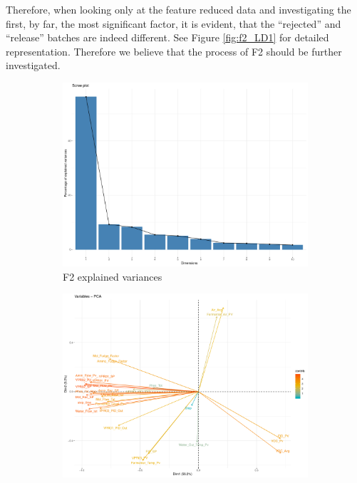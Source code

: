 Therefore, when looking only at the feature reduced data and investigating the first, by far, the most significant factor, it is evident, that the ``rejected'' and ``release'' batches are indeed different. See Figure \ref{fig:f2_LD1} for detailed representation. Therefore we believe that the process of F2 should be further investigated.

\begin{figure}[ht!]
    \begin{subfigure}{0.3\textwidth}
        \begin{center}
        \includegraphics[width=\textwidth]{plots/f2_explained_variances.pdf}       
        \end{center}
        \caption{F2 explained variances}
        \label{fig:f2_explained_variances}
    \end{subfigure}%
    \begin{subfigure}{0.3\textwidth}
        \begin{center}
        \includegraphics[width=\textwidth]{plots/f2_graph_of_variables.pdf}

\end{center}
\end{subfigure}
\end{figure}

